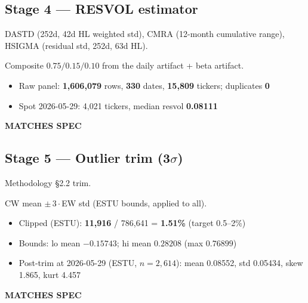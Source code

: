 \documentclass[11pt,a4paper]{article}
\newcommand{\PASS}[1]{\textcolor{pass}{\textbf{#1}}}
\begin{document}
\subsection{Stage 4 --- RESVOL estimator}

\begin{description}[style=nextline]
  \item[PDF SPEC] DASTD (252d, 42d HL weighted std), CMRA (12-month cumulative range), HSIGMA (residual std, 252d, 63d HL).
  \item[Implementation] Composite $0.75/0.15/0.10$ from the daily artifact + beta artifact.
  \item[Observed]\phantom{x}
    \begin{itemize}[nosep, topsep=-\parskip]
      \item Raw panel: \textbf{1{,}606{,}079} rows, \textbf{330} dates, \textbf{15{,}809} tickers; duplicates \textbf{0}
      \item Spot 2026-05-29: 4{,}021 tickers, median resvol \textbf{0.08111}
    \end{itemize}
  \item[Status] \PASS{MATCHES SPEC}
\end{description}

\subsection{Stage 5 --- Outlier trim (3$\sigma$)}

\begin{description}[style=nextline]
  \item[PDF SPEC] Methodology \S2.2 trim.
  \item[Implementation] CW mean $\pm\,3\cdot$EW std (ESTU bounds, applied to all).
  \item[Observed]\phantom{x}
    \begin{itemize}[nosep, topsep=-\parskip]
      \item Clipped (ESTU): \textbf{11{,}916} / 786{,}641 = \textbf{1.51\%} (target 0.5--2\%)
      \item Bounds: lo mean $-0.15743$; hi mean $0.28208$ (max $0.76899$)
      \item Post-trim at 2026-05-29 (ESTU, $n=2{,}614$): mean 0.08552, std 0.05434, skew 1.865, kurt 4.457
    \end{itemize}
  \item[Status] \PASS{MATCHES SPEC}
\end{description}
\end{document}
